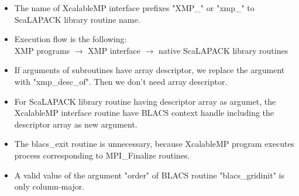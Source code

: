 \begin{itemize}
\item The name of XcalableMP interface prefixes "XMP\_" or "xmp\_" 
      to ScaLAPACK library routine name.
\item Execution flow is the following:\\
      XMP programs $\to$ XMP interface $\to$ native ScaLAPACK library routines
\item If arguments of subroutines have array descriptor,
      we replace the argument with "xmp\_desc\_of".
      Then we don't need array descriptor. 
\item For ScaLAPACK library routine having descriptor array as argumet,
      the XcalableMP interface routine have BLACS context handle including 
      the descriptor array as new argument.
\item The blacs\_exit routine is unnecessary, because XcalableMP program executes process 
      corresponding to MPI\_Finalize routines.
\item A valid value of the argument "order" of BLACS routine "blacs\_gridinit" is 
      only column-major. 
\end{itemize}
